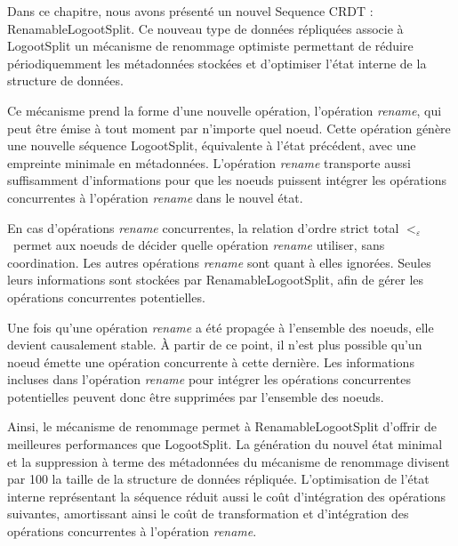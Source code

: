 \documentclass[12pt]{thesul}
\newcommand{\lepoch}{$<_{\varepsilon}$~}
\begin{document}
Dans ce chapitre, nous avons présenté un nouvel Sequence \ac{CRDT} : RenamableLogootSplit.
Ce nouveau type de données répliquées associe à LogootSplit un mécanisme de renommage optimiste permettant de réduire périodiquemment les métadonnées stockées et d'optimiser l'état interne de la structure de données.

Ce mécanisme prend la forme d'une nouvelle opération, l'opération \emph{rename}, qui peut être émise à tout moment par n'importe quel noeud.
Cette opération génère une nouvelle séquence LogootSplit, équivalente à l'état précédent, avec une empreinte minimale en métadonnées.
L'opération \emph{rename} transporte aussi suffisamment d'informations pour que les noeuds puissent intégrer les opérations concurrentes à l'opération \emph{rename} dans le nouvel état.

En cas d'opérations \emph{rename} concurrentes, la relation d'ordre strict total \lepoch permet aux noeuds de décider quelle opération \emph{rename} utiliser, sans coordination.
Les autres opérations \emph{rename} sont quant à elles ignorées.
Seules leurs informations sont stockées par RenamableLogootSplit, afin de gérer les opérations concurrentes potentielles.

Une fois qu'une opération \emph{rename} a été propagée à l'ensemble des noeuds, elle devient causalement stable.
À partir de ce point, il n'est plus possible qu'un noeud émette une opération concurrente à cette dernière.
Les informations incluses dans l'opération \emph{rename} pour intégrer les opérations concurrentes potentielles peuvent donc être supprimées par l'ensemble des noeuds.

Ainsi, le mécanisme de renommage permet à RenamableLogootSplit d'offrir de meilleures performances que LogootSplit.
La génération du nouvel état minimal et la suppression à terme des métadonnées du mécanisme de renommage divisent par 100 la taille de la structure de données répliquée.
L'optimisation de l'état interne représentant la séquence réduit aussi le coût d'intégration des opérations suivantes, amortissant ainsi le coût de transformation et d'intégration des opérations concurrentes à l'opération \emph{rename}.
\end{document}
